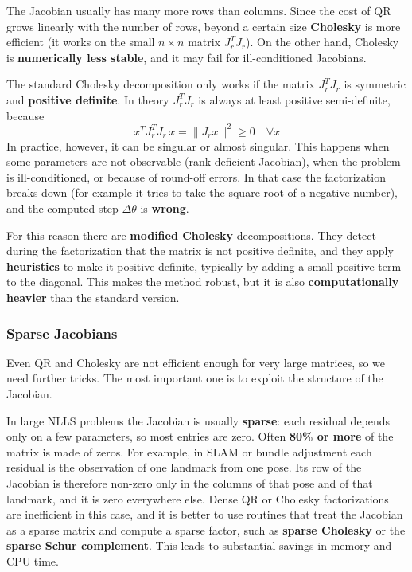 The Jacobian usually has many more rows than columns. Since the cost of QR grows linearly with the number of rows, beyond a certain size \textbf{Cholesky} is more efficient (it works on the small $n\times n$ matrix $J_r^T J_r$).
On the other hand, Cholesky is \textbf{numerically less stable}, and it may fail for ill-conditioned Jacobians.

The standard Cholesky decomposition only works if the matrix $J_r^T J_r$ is symmetric and \textbf{positive definite}. In theory $J_r^T J_r$ is always at least positive semi-definite, because
\[
x^T J_r^T J_r\, x = \lVert J_r x \rVert^2 \ge 0 \quad \forall x
\]
In practice, however, it can be singular or almost singular. This happens when some parameters are not observable (rank-deficient Jacobian), when the problem is ill-conditioned, or because of round-off errors. In that case the factorization breaks down (for example it tries to take the square root of a negative number), and the computed step $\Delta\theta$ is \textbf{wrong}.

For this reason there are \textbf{modified Cholesky} decompositions. They detect during the factorization that the matrix is not positive definite, and they apply \textbf{heuristics} to make it positive definite, typically by adding a small positive term to the diagonal. This makes the method robust, but it is also \textbf{computationally heavier} than the standard version.

\subsubsection{Sparse Jacobians}
Even QR and Cholesky are not efficient enough for very large matrices, so we need further tricks. The most important one is to exploit the structure of the Jacobian.

In large NLLS problems the Jacobian is usually \textbf{sparse}: each residual depends only on a few parameters, so most entries are zero. Often \textbf{80\% or more} of the matrix is made of zeros.
For example, in SLAM or bundle adjustment each residual is the observation of one landmark from one pose. Its row of the Jacobian is therefore non-zero only in the columns of that pose and of that landmark, and it is zero everywhere else.
Dense QR or Cholesky factorizations are inefficient in this case, and it is better to use routines that treat the Jacobian as a sparse matrix and compute a sparse factor, such as \textbf{sparse Cholesky} or the \textbf{sparse Schur complement}.
This leads to substantial savings in memory and CPU time.

